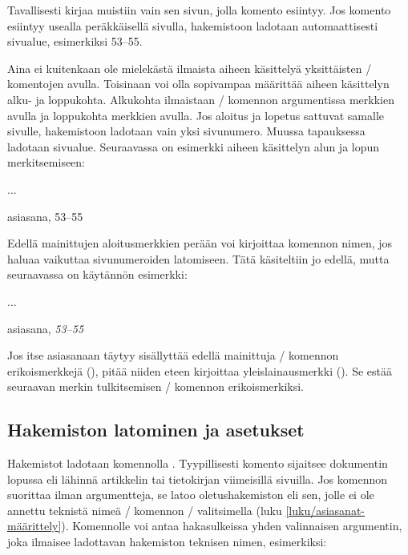 Tavallisesti  kirjaa muistiin vain sen sivun, jolla
komento esiintyy. Jos komento esiintyy usealla peräkkäisellä sivulla,
hakemistoon ladotaan automaattisesti sivualue, esimerkiksi 53--55.

Aina ei kuitenkaan ole mielekästä ilmaista aiheen käsittelyä
yksittäisten \-/ komentojen avulla. Toisinaan voi olla
sopivampaa määrittää aiheen käsittelyn alku- ja loppukohta. Alkukohta
ilmaistaan \-/ komennon argumentissa merkkien \koodi{|(}
avulla ja loppukohta merkkien \koodi{|)} avulla. Jos aloitus ja lopetus
sattuvat samalle sivulle, hakemistoon ladotaan vain yksi sivunumero.
Muussa tapauksessa ladotaan sivualue. Seuraavassa on esimerkki aiheen
käsittelyn alun ja lopun merkitsemiseen:

\begin{koodilohkosis}
...
\end{koodilohkosis}

\begin{tulossis}
  asiasana, 53--55
\end{tulossis}

\noindent
Edellä mainittujen aloitusmerkkien \koodi{|(} perään voi kirjoittaa
komennon nimen, jos haluaa vaikuttaa sivunumeroiden latomiseen. Tätä
käsiteltiin jo edellä, mutta seuraavassa on käytännön esimerkki:

\begin{koodilohkosis}
...
\end{koodilohkosis}

\begin{tulossis}
  asiasana, \textit{53--55}
\end{tulossis}

\noindent
Jos itse asiasanaan täytyy sisällyttää edellä mainittuja
\-/ komennon erikoismerkkejä (), pitää niiden
eteen kirjoittaa yleislainausmerkki (\koodi{\textquotedbl}). Se estää
seuraavan merkin tulkitsemisen \-/ komennon
erikoismerkiksi.

\subsection{Hakemiston latominen ja asetukset}
\label{luku/asiasanat-asetukset}

Hakemistot ladotaan komennolla . Tyypillisesti
komento sijaitsee dokumentin lopussa eli lähinnä artikkelin tai
tietokirjan viimeisillä sivuilla. Jos komennon suorittaa ilman
argumentteja, se latoo oletushakemiston eli sen, jolle ei ole annettu
teknistä nimeä \-/ komennon \-/
valitsimella (luku \ref{luku/asiasanat-määrittely}). Komennolle voi
antaa hakasulkeissa yhden valinnaisen argumentin, joka ilmaisee
ladottavan hakemiston teknisen nimen, esimerkiksi:

